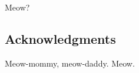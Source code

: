 \documentclass[9pt,oneside]{amsart}
\begin{document}
\begin{multicols}{2}
 Meow?

\subsection{Acknowledgments}

 Meow-mommy, meow-daddy. Meow. 

 
{}
\nocite{*}


\end{multicols}


\appendix
 
 
 
 
 
\end{document}
